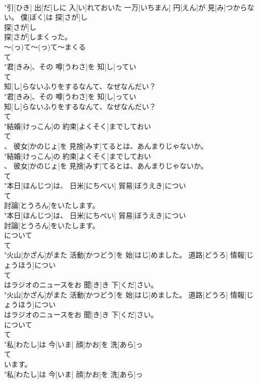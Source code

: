 \documentclass[8pt]{extreport}
\begin{document}
\begin{CJK}{UTF8}{min}
\\	"引[ひき] 出[だ]しに 入[い]れておいた 一万[いちまん] 円[えん]が 見[み]つからない。 僕[ぼく]は 探[さが]し
\\	探[さが]し
\\	探[さが]しまくった。
\\	～(っ)て～(っ)て～まくる	
\\	て
\\	"君[きみ]、その 噂[うわさ]を 知[し]ってい
\\	て
\\	知[し]らないふりをするなんて、なぜなんだい？
\\	"君[きみ]、その 噂[うわさ]を 知[し]ってい
\\	知[し]らないふりをするなんて、なぜなんだい？
\\	て
\\	"結婚[けっこん]の 約束[よくそく]までしておい
\\	て
\\	、 彼女[かのじょ]を 見捨[みす]てるとは、あんまりじゃないか。
\\	"結婚[けっこん]の 約束[よくそく]までしておい
\\	、 彼女[かのじょ]を 見捨[みす]てるとは、あんまりじゃないか。
\\	て
\\	"本日[ほんじつ]は、 日米[にちべい] 貿易[ぼうえき]につい
\\	て
\\	討論[とうろん]をいたします。
\\	"本日[ほんじつ]は、 日米[にちべい] 貿易[ぼうえき]につい
\\	討論[とうろん]をいたします。
\\	について	
\\	て
\\	"火山[かざん]がまた 活動[かつどう]を 始[はじ]めました。 道路[どうろ] 情報[じょうほう]につい
\\	て
\\	はラジオのニュースをお 聞[き]き 下[くだ]さい。
\\	"火山[かざん]がまた 活動[かつどう]を 始[はじ]めました。 道路[どうろ] 情報[じょうほう]につい
\\	はラジオのニュースをお 聞[き]き 下[くだ]さい。
\\	について	
\\	て
\\	"私[わたし]は 今[いま] 顔[かお]を 洗[あら]っ
\\	て
\\	います。
\\	"私[わたし]は 今[いま] 顔[かお]を 洗[あら]っ

\end{CJK}
\end{document}
